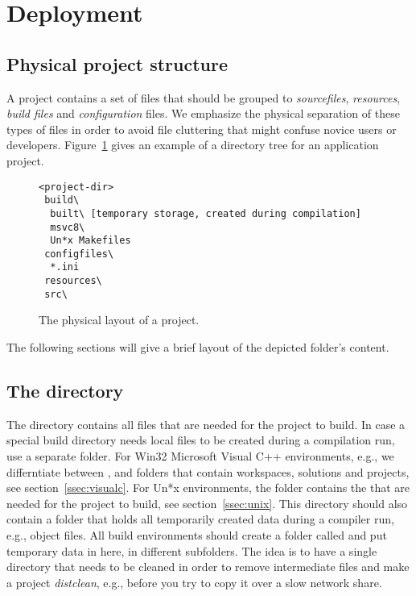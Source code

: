


\section{Deployment}

\subsection{Physical project structure}
A project contains a set of files that should be grouped to \emph{sourcefiles}, \emph{resources}, \emph{build files} and \emph{configuration} files.
We emphasize the physical separation of these types of files in order to avoid file cluttering that might confuse novice users or developers.
Figure~\ref{fig:ProjectPhysicalLayout} gives an example of a directory tree for an application project.
\begin{figure}
\begin{verbatim}
<project-dir>
 build\
  built\ [temporary storage, created during compilation]
  msvc8\
  Un*x Makefiles
 configfiles\
  *.ini
 resources\
 src\
\end{verbatim}
\caption{\label{fig:ProjectPhysicalLayout}The physical layout of a project.}
\end{figure}
The following sections will give a brief layout of the depicted folder's content.

\subsection{The  directory}
The \code{build} directory contains all files that are needed for the project to build.
In case a special build directory needs local files to be created during a compilation run, use a separate folder.
For Win32 Microsoft Visual C++ environments, e.g., we differntiate between ,  and  folders that contain workspaces, solutions and projects, see section~\ref{ssec:visualc}.
For Un*x environments, the folder contains the  that are needed for the project to build, see section~\ref{ssec:unix}.
This directory should also contain a folder that holds all temporarily created data during a compiler run, e.g., object files.
All build environments should create a folder called \code{built} and put temporary data in here, in different subfolders.
The idea is to have a single directory that needs to be cleaned in order to remove intermediate files and make a project \emph{distclean}, e.g., before you try to copy it over a slow network share.

